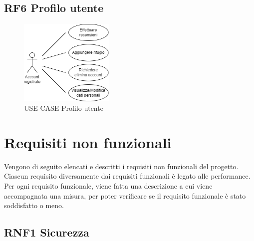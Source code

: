 \documentclass[a4paper,12pt]{article}
\begin{document}
\subsection*{RF6 Profilo utente}
\begin{figure}[H]
   \centering
   \includegraphics[width=0.4\textwidth]{img-D2/profilo_utente.png}
    \caption{USE-CASE Profilo utente}
\end{figure}



{\newpage}
\section{Requisiti non funzionali}

Vengono di seguito elencati e descritti i requisiti non funzionali del progetto. Ciascun requisito diversamente dai requisiti funzionali è legato alle performance.\\
Per ogni requisito funzionale, viene fatta una descrizione a cui viene accompagnata una misura, per poter verificare se il requisito funzionale è stato soddisfatto o meno.

\subsection*{RNF1 Sicurezza}
\end{document}
